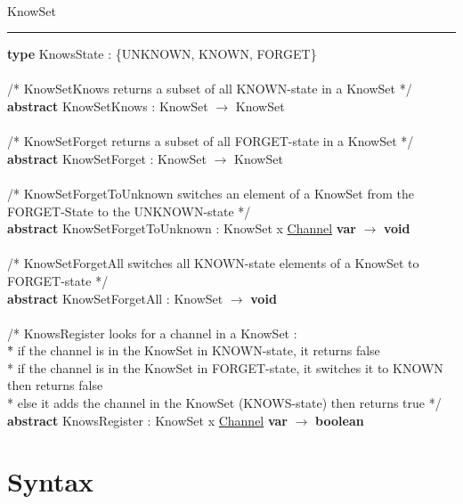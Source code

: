 \documentclass[a4paper,11pt]{article}
\newenvironment{program}{
  \begin{sffamily}
  \begin{scriptsize}
  \begin{tabbing}}
 {\end{tabbing}
  \end{scriptsize}
  \end{sffamily}}
\newcommand{\kw}[1]{\textsf{\textbf{#1}}}
\newcommand{\pindent}{\hspace{2em}\=}
\newcommand{\algotitle}[1]{\noindent\\ \noindent#1\par\nobreak\vspace{3pt}\hrule\vspace{6pt}}
\newcommand{\algosection}[1]{
  \phantomsection
  \algotitle{#1}
}
\newcommand{\myref}[1]{
  \hyperref[#1]{#1}
}
\begin{document}
\algosection{KnowSet}
\begin{program}
  \kw{type} KnowsState : \{UNKNOWN, KNOWN, FORGET\} \\ \\
  /* KnowSetKnows returns a subset of all KNOWN-state in a KnowSet */ \\
  \kw{abstract} KnowSetKnows : KnowSet $\rightarrow$ KnowSet \\ \\
  /* KnowSetForget returns a subset of all FORGET-state in a KnowSet */ \\
  \kw{abstract} KnowSetForget : KnowSet $\rightarrow$ KnowSet \\ \\
  /* KnowSetForgetToUnknown switches an element of a KnowSet from the FORGET-State to the UNKNOWN-state */ \\
  \kw{abstract} KnowSetForgetToUnknown : KnowSet x \myref{Channel} \kw{var} $\rightarrow$ \kw{void} \\ \\
  /* KnowSetForgetAll switches all KNOWN-state elements of a KnowSet to FORGET-state */ \\
  \kw{abstract} KnowSetForgetAll : KnowSet $\rightarrow$ \kw{void} \\ \\
  /* KnowsRegister looks for a channel in a KnowSet : \\
  \pindent * if the channel is in the KnowSet in KNOWN-state, it returns false \\
  \> * if the channel is in the KnowSet in FORGET-state, it switches it to KNOWN then returns false \\
  \> * else it adds the channel in the KnowSet (KNOWS-state) then returns true */ \\
  \kw{abstract} KnowsRegister : KnowSet x \myref{Channel} \kw{var} $\rightarrow$ \kw{boolean}
\end{program}



\section{Syntax}
\end{document}
